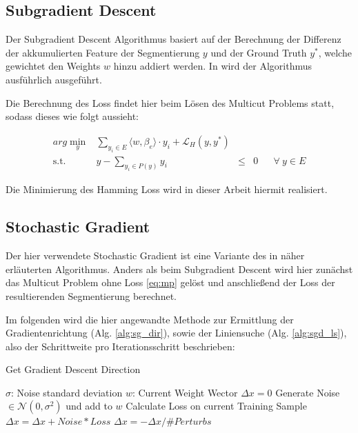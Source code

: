 \subsection{Subgradient Descent}

Der Subgradient Descent Algorithmus basiert auf der Berechnung der Differenz der akkumulierten Feature der Segmentierung $y$ und der Ground Truth $y^*$, welche gewichtet den Weights $w$ hinzu addiert werden. In \cite{NowozinStrucLearn11} wird der Algorithmus ausführlich ausgeführt. 

Die Berechnung des Loss findet hier beim Lösen des Multicut Problems statt, sodass dieses wie folgt aussieht:

\begin{equation} 
\begin{array}{rrclcl}
\displaystyle arg \min_{y} & \sum\limits_{y_i \in E} \langle w, \beta_e \rangle \cdot y_i + \mathcal{L}_H(y, y^*) \\
\textrm{s.t.} &  y - \sum\limits_{y_i \in P(y)} y_i & \le & 0 & & \forall \ y \in E
\end{array}
\label{eq:mp-hamming}
\end{equation}

Die Minimierung des Hamming Loss wird in dieser Arbeit hiermit realisiert.

\subsection{Stochastic Gradient}

Der hier verwendete Stochastic Gradient ist eine Variante des in \cite{NowozinStrucLearn11} näher erläuterten Algorithmus. Anders als beim Subgradient Descent wird hier zunächst das Multicut Problem ohne Loss \eqref{eq:mp} gelöst und anschließend der Loss der resultierenden Segmentierung berechnet.

Im folgenden wird die hier angewandte Methode zur Ermittlung der Gradientenrichtung (Alg. \ref{alg:sg_dir}), sowie der Liniensuche (Alg. \ref{alg:sgd_ls}), also der Schrittweite pro Iterationsschritt beschrieben: \\

\begin{algorithm}[H]
\caption{Get Gradient Descent Direction}\label{alg:sg_dir}
\begin{algorithmic}[1]
	\State $\sigma$: Noise standard deviation
	\State $w$: Current Weight Wector
	\State
	\State $\Delta x = 0$
		\State Generate Noise $\in \mathcal{N}(0, \sigma^2)$ und add to $w$
		\State Calculate Loss on current Training Sample
		\State $\Delta x = \Delta x + Noise*Loss$
	\EndFor
	\State $\Delta x = -\Delta x / \#Perturbs$
	\State {}
\EndProcedure
\end{algorithmic}
\end{algorithm}

